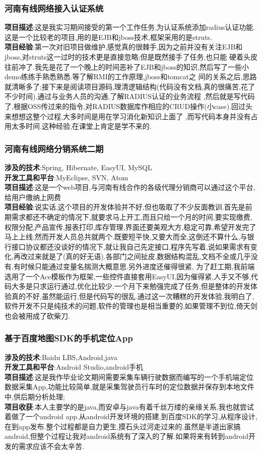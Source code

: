 \documentclass[11pt]{ctexart}
\begin{document}
\subsubsection{河南有线网络接入认证系统}
\label{sec-1-4-1}
\textbf{项目描述}:这是我实习期间接受的第一个工作任务,为认证系统添加radius认证功能.这是一个比较老的项目,用的是EJB和jboss技术,框架采用的是struts.\\
\textbf{项目经验}:第一次对旧项目做维护,感觉真的很棘手,因为之前并没有关注EJB和jboss,对struts这一过时的技术更是直接忽略;但是既然接手了任务,也只能
硬着头皮往前冲了.我先是花了一个晚上的时间恶补了EJB和jboss的知识,然后写了一些小demo练练手熟悉熟悉.等了解RMI的工作原理,jboss和tomcat之
间的关系之后,思路就清晰多了;接下来是阅读项目源码,理清逻辑结构(代码没有文档,真的很痛苦,花了不少时间).通过与业务人员的沟通,了解RADIUS认证的业务流程
,然后就是写代码了,根据OSS传过来的指令,对RADIUS数据库作相应的CRUD操作(小case).回过头来想想这整个过程,大多时间是用在学习消化新知识上面了
,而写代码本身并没有占用太多时间.这种经验,在课堂上肯定是学不来的.
\subsubsection{河南有线网络分销系统二期}
\label{sec-1-4-2}
\textbf{涉及的技术}:Spring, Hibernate, EasyUI, MySQL\\
\textbf{开发工具和平台}:MyEclipse, SVN, Atom\\
\textbf{项目描述}:这是一个web项目,与河南有线合作的各级代理分销商可以通过这个平台,给用户缴纳上网费\\
\textbf{项目经验}:说实话,这个项目的开发体验并不好,但也吸取了不少反面教训.首先是前期需求都还不确定的情况下,就要求马上开工,而且只给一个月的时间,要实现缴费,权限分配,产品宣传,报表打印,库存管理,界面还要美观大方,稳定可靠,希望开发完了马上上线,然而开发人员总共就两个.既要短平快,又要大而全,这倒还不算什么,与银行接口协议都还没谈好的情况下,就让我自己先定接口,程序先写着,说如果需求有变化,再改过来就是了(真的好无语).各部门之间扯皮,数据结构混乱,文档不全或几乎没有,有时候只能通过变量名揣测大概意思.另外进度还催得很紧,
为了赶工期,我前端选用了一个Ace模板作为框架,一些控件直接套用EasyUI,因为催得紧,人手又不够,代码大多是只求运行通过,优化比较少.一个月下来勉强完成了任务,但是整体的开发体验真的不好,虽然能运行,但是代码写的很乱.通过这一次糟糕的开发体验,我明白了,软件开发不只是纯技术的问题,软件的管理也是相当重要的,如果管理不到位,倚天剑也会被用成了砍柴刀.
\subsubsection{基于百度地图SDK的手机定位App}
\label{sec-1-4-3}
\textbf{涉及的技术}:Baidu LBS,Android,java\\
\textbf{开发工具和平台}:Android Studio,android手机\\
\textbf{项目描述}:这是我作毕业论文期间需要采集车辆行驶数据而编写的一个手机端定位数据采集App,功能比较简单,就是采集驾驶员行车时的定位数据并保存到本地文件中,供后期分析处理;\\
\textbf{项目收获}:本人主要学的是java,而安卓与java有着千丝万缕的亲缘关系,我也就尝试着做了一个android app.从android开发环境的搭建,到百度SDK的学习,从程序设计,在到app发布.整个过程都是自力更生,摸石头过河走过来的.虽然是半道出家搞android,但整个过程让我对android系统有了深入的了解.如果将来有转到android开发的需求应该不会太辛苦.\\
\end{document}
